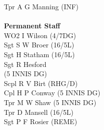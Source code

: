 \begin{multicols}{3}
  Tpr A G Manning (INF) \\
  \\
  \textbf{Permanent Staff} \\
  WO2 I Wilson (4/7DG) \\
  Sgt S W Broer (16/5L) \\
  Sgt H Statham (16/5L) \\
  Sgt R Hesford \\ \indent (5 INNIS DG) \\
  Scpl R V Birt (RHG/D) \\
  Cpl H P Conway (5 INNIS DG) \\
  Tpr M W Shaw (5 INNIS DG) \\
  Tpr D Mansell (16/5L) \\
  Sgt P F Rosier (REME) \\
\end{multicols}
